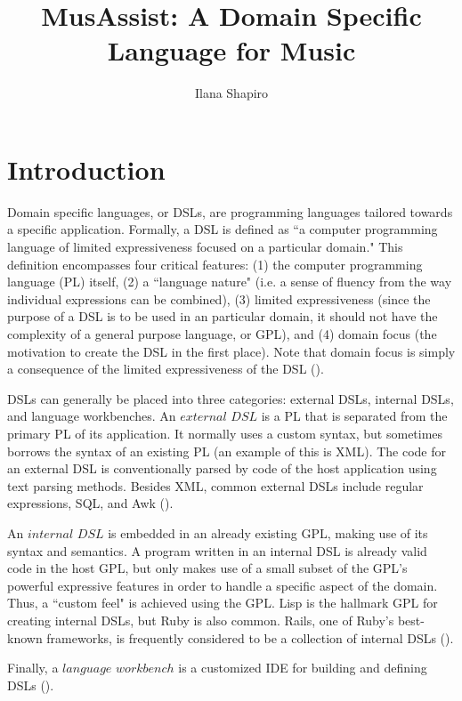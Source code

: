 \documentclass{report}
\title{MusAssist: A Domain Specific Language for Music }
\author{Ilana Shapiro}
\newcommand\citeparen[1]{(\cite{#1})}
\begin{document}
\maketitle

\tableofcontents

\chapter{Introduction}

Domain specific languages, or DSLs, are programming languages tailored towards a specific application. Formally, a DSL is defined as ``a computer programming language of limited expressiveness focused on a particular domain." This definition encompasses four critical features: (1) the computer programming language (PL) itself, (2) a ``language nature" (i.e. a sense of fluency from the way individual expressions can be combined), (3) limited expressiveness (since the purpose of a DSL is to be used in an particular domain, it should not have the complexity of a general purpose language, or GPL), and (4) domain focus (the motivation to create the DSL in the first place). Note that domain focus is  simply a consequence of the limited expressiveness of the DSL \citeparen{fowler_parsons_2011}.

DSLs can generally be placed into three categories: external DSLs, internal DSLs, and language workbenches. An $external$ $DSL$ is a PL that is separated  from the primary PL of its application. It normally uses a custom syntax, but sometimes borrows the syntax of an existing PL (an example of this is XML). The code for an external DSL is conventionally parsed by code of the host application using text parsing methods. Besides XML, common external DSLs include regular expressions, SQL, and Awk  \citeparen{fowler_parsons_2011}.

An $internal$ $DSL$ is embedded in an already existing GPL, making use  of its  syntax and semantics. A program written in an internal DSL is already valid code in the host GPL, but only makes use of a small subset of the GPL's powerful expressive features in order to handle a specific aspect of the domain. Thus, a ``custom feel" is achieved using the GPL. Lisp is the hallmark GPL for creating internal DSLs, but Ruby is also common. Rails, one of Ruby's best-known frameworks, is frequently considered to be a collection of internal DSLs   \citeparen{fowler_parsons_2011}.

Finally, a $ language$ $workbench$ is a customized IDE for building and defining DSLs \citeparen{fowler_parsons_2011}. 
\end{document}
